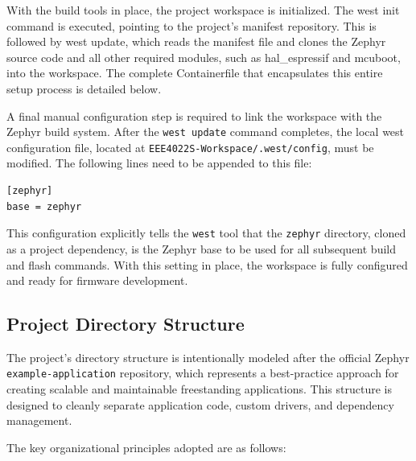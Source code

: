 With the build tools in place, the project workspace is initialized. The west init command is executed, pointing to the project's manifest repository. This is followed by west update, which reads the manifest file and clones the Zephyr source code and all other required modules, such as hal\_espressif and mcuboot, into the workspace. The complete Containerfile that encapsulates this entire setup process is detailed below.

A final manual configuration step is required to link the workspace with the Zephyr build system. After the \texttt{west update} command completes, the local west configuration file, located at \texttt{EEE4022S-Workspace/.west/config}, must be modified. The following lines need to be appended to this file:

\begin{verbatim}
[zephyr]
base = zephyr
\end{verbatim}

This configuration explicitly tells the \texttt{west} tool that the \texttt{zephyr} directory, cloned as a project dependency, is the Zephyr base to be used for all subsequent build and flash commands. With this setting in place, the workspace is fully configured and ready for firmware development.

\subsection{Project Directory Structure}

The project's directory structure is intentionally modeled after the official Zephyr \texttt{example-application} repository, which represents a best-practice approach for creating scalable and maintainable freestanding applications. This structure is designed to cleanly separate application code, custom drivers, and dependency management.

The key organizational principles adopted are as follows:

